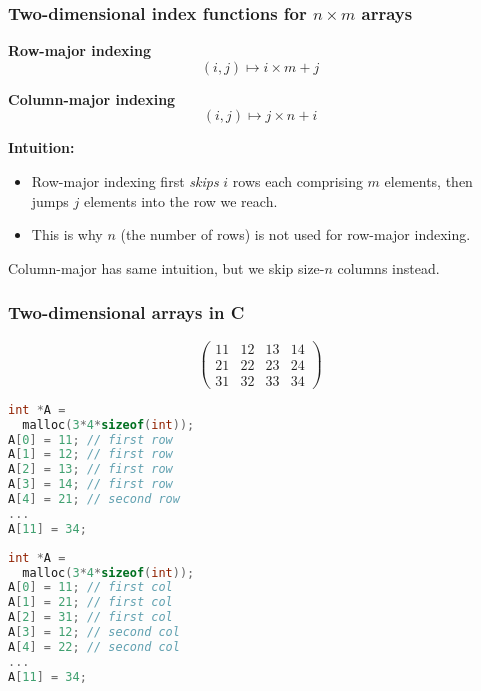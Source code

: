 \documentclass[rgb,dvipsnames,aspectratio=169,xcolor=table]{beamer}
\begin{document}
\begin{frame}
  \frametitle{Two-dimensional index functions for $n\times{}m$ arrays}

  \begin{minipage}{0.45\textwidth}
    \textbf{Row-major indexing}
    \bigskip
    \begin{equation*}
      (i,j) \mapsto i\times m + j
    \end{equation*}
  \end{minipage}
  \hfill
  \begin{minipage}{0.45\textwidth}
    \textbf{Column-major indexing}
    \bigskip
    \begin{equation*}
      (i,j) \mapsto j\times n + i
    \end{equation*}
  \end{minipage}

  \bigskip

  \textbf{Intuition:}
  \begin{itemize}
  \item Row-major indexing first \textit{skips} $i$ rows
    each comprising $m$ elements, then jumps $j$ elements into the row
    we reach.
  \item This is why $n$ (the number of rows) is not used for row-major
    indexing.
  \end{itemize}
  \bigskip Column-major has same intuition, but we skip size-$n$
  columns instead.

\end{frame}

\begin{frame}
  \frametitle{Two-dimensional arrays in C}

\begin{equation*}
  \begin{pmatrix}
    11 & 12 & 13 & 14 \\
    21 & 22 & 23 & 24 \\
    31 & 32 & 33 & 34
  \end{pmatrix}
\end{equation*}

\begin{minipage}{0.4\linewidth}
\begin{lstlisting}[language=C]
int *A =
  malloc(3*4*sizeof(int));
A[0] = 11; // first row
A[1] = 12; // first row
A[2] = 13; // first row
A[3] = 14; // first row
A[4] = 21; // second row
...
A[11] = 34;
\end{lstlisting}
\end{minipage}
\hfill
\begin{minipage}{0.4\linewidth}
\begin{lstlisting}[language=C]
int *A =
  malloc(3*4*sizeof(int));
A[0] = 11; // first col
A[1] = 21; // first col
A[2] = 31; // first col
A[3] = 12; // second col
A[4] = 22; // second col
...
A[11] = 34;
\end{lstlisting}
\end{minipage}

\end{frame}
\end{document}
